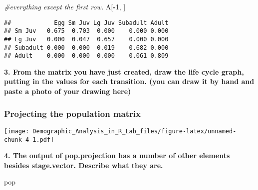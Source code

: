 \documentclass[]{article}
\newenvironment{Shaded}{\begin{snugshade}}{\end{snugshade}}
\newcommand{\KeywordTok}[1]{\textcolor[rgb]{0.13,0.29,0.53}{\textbf{#1}}}
\newcommand{\DataTypeTok}[1]{\textcolor[rgb]{0.13,0.29,0.53}{#1}}
\newcommand{\DecValTok}[1]{\textcolor[rgb]{0.00,0.00,0.81}{#1}}
\newcommand{\StringTok}[1]{\textcolor[rgb]{0.31,0.60,0.02}{#1}}
\newcommand{\CommentTok}[1]{\textcolor[rgb]{0.56,0.35,0.01}{\textit{#1}}}
\newcommand{\OperatorTok}[1]{\textcolor[rgb]{0.81,0.36,0.00}{\textbf{#1}}}
\newcommand{\NormalTok}[1]{#1}
\begin{document}
\begin{Shaded}
\begin{Highlighting}[]
\CommentTok{#everything except the first row.}
\NormalTok{A[}\OperatorTok{-}\DecValTok{1}\NormalTok{, ] }
\end{Highlighting}
\end{Shaded}

\begin{verbatim}
##            Egg Sm Juv Lg Juv Subadult Adult
## Sm Juv   0.675  0.703  0.000    0.000 0.000
## Lg Juv   0.000  0.047  0.657    0.000 0.000
## Subadult 0.000  0.000  0.019    0.682 0.000
## Adult    0.000  0.000  0.000    0.061 0.809
\end{verbatim}

\textbf{3. From the matrix you have just created, draw the life cycle
graph, putting in the values for each transition. (you can draw it by
hand and paste a photo of your drawing here)}

\subsubsection{Projecting the population
matrix}\label{projecting-the-population-matrix}

\begin{Shaded}
\end{Shaded}

\texttt{[image: Demographic\_Analysis\_in\_R\_Lab\_files/figure-latex/unnamed-chunk-4-1.pdf]}

\textbf{4. The output of pop.projection has a number of other elements
besides stage.vector. Describe what they are.}

\begin{Shaded}
\begin{Highlighting}[]
\NormalTok{pop}
\end{Highlighting}
\end{Shaded}
\end{document}
